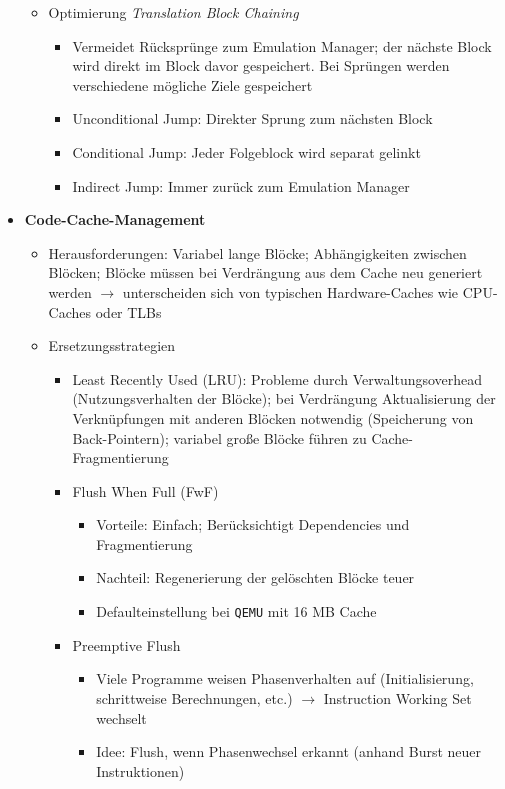 \begin{itemize}
\begin{itemize}
		\item Optimierung \textit{Translation Block Chaining}
		\begin{itemize}
			\item Vermeidet Rücksprünge zum Emulation Manager; der nächste Block wird direkt im Block davor gespeichert. Bei Sprüngen werden verschiedene mögliche Ziele gespeichert
			\item Unconditional Jump: Direkter Sprung zum nächsten Block
			\item Conditional Jump: Jeder Folgeblock wird separat gelinkt
			\item Indirect Jump: Immer zurück zum Emulation Manager
		\end{itemize}
	\end{itemize}
	\item \textbf{Code-Cache-Management}
	\begin{itemize}
		\item Herausforderungen: Variabel lange Blöcke; Abhängigkeiten zwischen Blöcken; Blöcke müssen bei Verdrängung aus dem Cache neu generiert werden \(\rightarrow\) unterscheiden sich von typischen Hardware-Caches wie CPU-Caches oder TLBs
		\item Ersetzungsstrategien
		\begin{itemize}
			\item Least Recently Used (LRU): Probleme durch Verwaltungsoverhead (Nutzungsverhalten der Blöcke); bei Verdrängung Aktualisierung der Verknüpfungen mit anderen Blöcken notwendig (Speicherung von Back-Pointern); variabel große Blöcke führen zu Cache-Fragmentierung
			\item Flush When Full (FwF)
			\begin{itemize}
				\item Vorteile: Einfach; Berücksichtigt Dependencies und Fragmentierung
				\item Nachteil: Regenerierung der gelöschten Blöcke teuer
				\item Defaulteinstellung bei \texttt{QEMU} mit 16 MB Cache
			\end{itemize}
			\item Preemptive Flush
			\begin{itemize}
				\item Viele Programme weisen Phasenverhalten auf (Initialisierung, schrittweise Berechnungen, etc.) \(\rightarrow\) Instruction Working Set wechselt
				\item Idee: Flush, wenn Phasenwechsel erkannt (anhand Burst neuer Instruktionen)
			\end{itemize}

\end{itemize}
\end{itemize}
\end{itemize}
